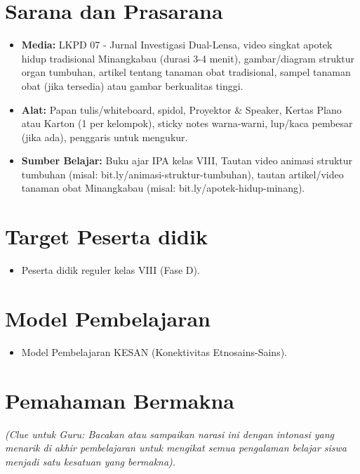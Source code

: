 \documentclass[a4paper,12pt]{article}
\begin{document}
\section{Sarana dan Prasarana}

\begin{itemize}
\item \textbf{Media:} LKPD 07 - Jurnal Investigasi Dual-Lensa, video singkat apotek hidup tradisional Minangkabau (durasi 3-4 menit), gambar/diagram struktur organ tumbuhan, artikel tentang tanaman obat tradisional, sampel tanaman obat (jika tersedia) atau gambar berkualitas tinggi.
\item \textbf{Alat:} Papan tulis/whiteboard, spidol, Proyektor \& Speaker, Kertas Plano atau Karton (1 per kelompok), sticky notes warna-warni, lup/kaca pembesar (jika ada), penggaris untuk mengukur.
\item \textbf{Sumber Belajar:} Buku ajar IPA kelas VIII, Tautan video animasi struktur tumbuhan (misal: bit.ly/animasi-struktur-tumbuhan), tautan artikel/video tanaman obat Minangkabau (misal: bit.ly/apotek-hidup-minang).
\end{itemize}

\section{Target Peserta didik}

\begin{itemize}
\item Peserta didik reguler kelas VIII (Fase D).
\end{itemize}

\section{Model Pembelajaran}

\begin{itemize}
\item Model Pembelajaran KESAN (Konektivitas Etnosains-Sains).
\end{itemize}

\section{Pemahaman Bermakna}
\textit{(Clue untuk Guru: Bacakan atau sampaikan narasi ini dengan intonasi yang menarik di akhir pembelajaran untuk mengikat semua pengalaman belajar siswa menjadi satu kesatuan yang bermakna).}
\end{document}
